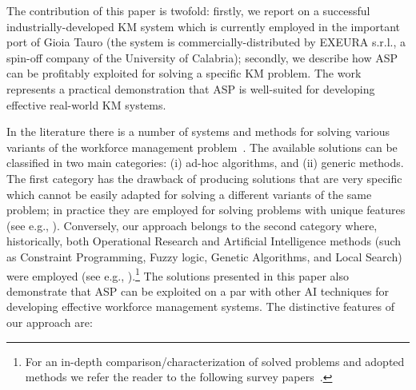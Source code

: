 \documentclass{tlp}
\begin{document}
The contribution of this paper is twofold:
firstly, we report on a successful industrially-developed KM system
which is currently employed in the important port of Gioia Tauro
(the system is commercially-distributed by EXEURA s.r.l.,
a spin-off company of the University of Calabria);
secondly, we describe how ASP can be profitably exploited for solving
a specific KM problem. The work
represents a practical demonstration  that ASP is well-suited
for developing effective real-world KM systems.

\medskip

In the literature there is a number of systems and methods for solving
various variants of the workforce management problem~\cite{nave-etal-2007,erns-etal,tien-etal,lau,yang}.
The available solutions can be classified in two main categories:
(i) ad-hoc algorithms, and
(ii) generic methods.
The first category has the drawback of producing solutions that
are very specific which cannot be easily adapted for solving
a different variants of the same problem; in practice they are employed
for solving problems with unique features
(see e.g., ).
Conversely, our approach belongs  to the second category where, historically,
both Operational Research and Artificial Intelligence methods
(such as Constraint Programming, Fuzzy logic, Genetic Algorithms, and Local Search)
were employed (see e.g., ).\footnote{For an in-depth comparison/characterization of solved problems
and adopted methods we refer the reader to the following
survey papers~\cite{nave-etal-2007,erns-etal,tien-etal,lau,yang}.}
The solutions presented in this paper also demonstrate that  ASP can be exploited
on a par with other AI techniques
for developing effective workforce management systems.
The distinctive features of our approach are:
\end{document}
